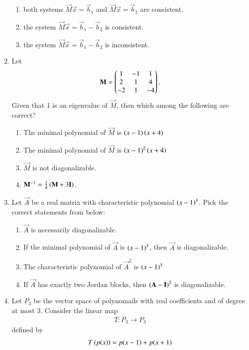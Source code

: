 \begin{enumerate}[label=\thesection.\arabic*.,ref=\thesection.\theenumi]
\begin{enumerate}
\item both systems $\vec{M}\vec{x} = \vec{b}_1$ and $\vec{M}\vec{x} = \vec{b}_2$ are consistent. 
\item the system $\vec{M}\vec{x} = \vec{b}_1-\vec{b}_2$ is consistent. 
\item the system $\vec{M}\vec{x} = \vec{b}_1-\vec{b}_2$ is inconsistent. 
\end{enumerate}
%
\item Let 
\begin{align}
\mathbf{M} = \begin{pmatrix}
1 & -1 & 1 \\
2 & 1 & 4 \\
-2 & 1 & -4 
\end{pmatrix}.
\end{align}
Given that 1 is an eigenvalue of $\vec{M}$, then which among the following
are correct?
\begin{enumerate}
\item The minimal polynomial of  $\vec{M}$ is $\left(x-1\right)\left(x+4\right)$ 
\item The minimal polynomial of  $\vec{M}$ is $\left(x-1\right)^2\left(x+4\right)$ 
\item   $\vec{M}$ is not diagonalizable.
\item $\mathbf{M}^{-1} = \frac{1}{4}\left(\mathbf{M}+3\mathbf{I}\right)$. 
\end{enumerate}
%
\solution

\item Let $\vec{A}$ be a real matrix with characteristic polynomial $\left(x-1\right)^3$.  Pick the correct statements from below:
\begin{enumerate}
\item $\vec{A}$ is necessarily diagonalizable.
\item If the minimal polynomial of  $\vec{A}$ is $\left(x-1\right)^3$, then  $\vec{A}$ is diagonalizable.
\item  The characteristic polynomial of  $\vec{A}^2$ is $\left(x-1\right)^3$
\item If $\vec{A}$ has exactly two Jordan blocks, then $\left(\mathbf{A}-\mathbf{I}\right)^2$ is diagonalizable. 
\end{enumerate}
\solution

%
\item Let $P_3$ be the vector space of polynomails with real coefficients and of degree at most 3.  Consider the linear map
\begin{align}
T:P_3\to P_3
\end{align}
defined by 
\begin{align}
T\left(p(x)\right) = p(x-1)+p(x+1)
\end{align}

\end{enumerate}
